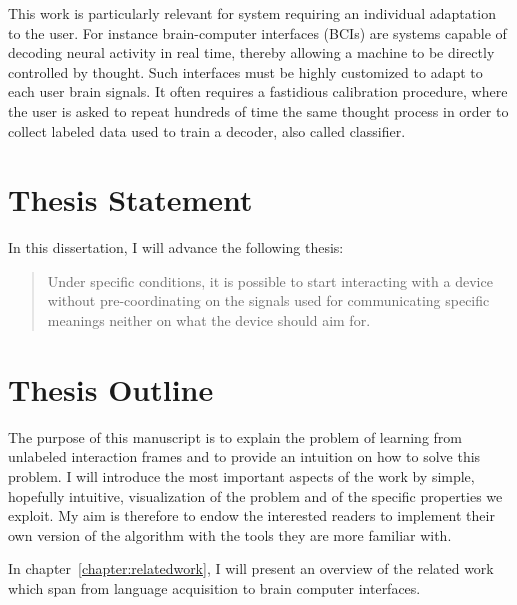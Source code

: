 This work is particularly relevant for system requiring an individual adaptation to the user. For instance brain-computer interfaces (BCIs) are systems capable of decoding neural activity in real time, thereby allowing a machine to be directly controlled by thought. Such interfaces must be highly customized to adapt to each user brain signals. It often requires a fastidious calibration procedure, where the user is asked to repeat hundreds of time the same thought process in order to collect labeled data used to train a decoder, also called classifier.

\section{Thesis Statement}

In this dissertation, I will advance the following thesis:

\begin{quote}
Under specific conditions, it is possible to start interacting with a device without pre-coordinating on the signals used for communicating specific meanings neither on what the device should aim for.
\end{quote}

\section{Thesis Outline}

The purpose of this manuscript is to explain the problem of learning from unlabeled interaction frames and to provide an intuition on how to solve this problem. I will introduce the most important aspects of the work by simple, hopefully intuitive, visualization of the problem and of the specific properties we exploit. My aim is therefore to endow the interested readers to implement their own version of the algorithm with the tools they are more familiar with.

In chapter~\ref{chapter:relatedwork}, I will present an overview of the related work which span from language acquisition to brain computer interfaces.

